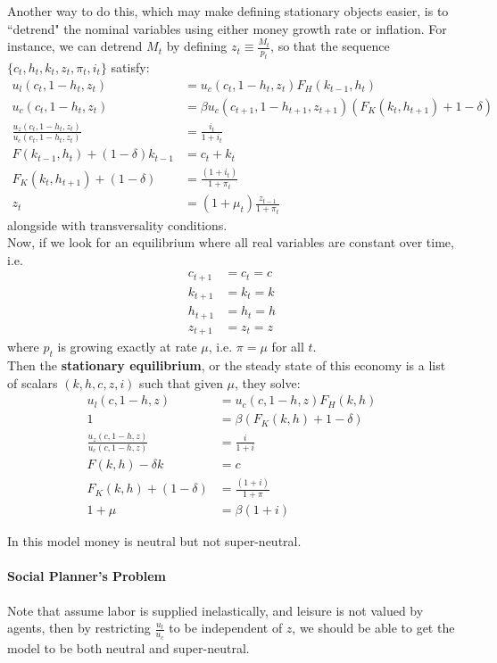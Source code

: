 \documentclass[12pt]{article}
\begin{document}
Another way to do this, which may make defining stationary objects easier, is to ``detrend" the nominal variables using either money growth rate or inflation. For instance, we can detrend $M_t$ by defining $z_t \equiv \frac{M_t}{p_t}$, so that the sequence $\{c_t, h_t, k_t, z_t, \pi_t, i_t\}$ satisfy:
\begin{align}
	u_l(c_t, 1-h_t, z_t) &= u_c(c_t, 1-h_t, z_t)F_H(k_{t-1}, h_t)\\
	u_c(c_t, 1-h_t, z_t) &= \beta u_c(c_{t+1}, 1-h_{t+1}, z_{t+1})(F_K(k_t, h_{t+1}) + 1 - \delta)\\
	\frac{u_z(c_t, 1-h_t, z_t)}{u_c(c_t, 1-h_t, z_t)} &= \frac{i_t}{1+i_t}\\
	F(k_{t-1}, h_t) + (1-\delta)k_{t-1} &= c_t + k_t\\
	F_K(k_t, h_{t+1}) + (1-\delta) &= \frac{(1+i_t)}{1+\pi_t}\\
	z_t &= (1+\mu_t) \frac{z_{t-1}}{1+\pi_t}
\end{align}
alongside with transversality conditions.\\
Now, if we look for an equilibrium where all real variables are constant over time, i.e.
\begin{align*}
	c_{t+1} &= c_t = c\\
	k_{t+1} &= k_t = k\\
	h_{t+1} &= h_t = h\\
	z_{t+1} &= z_t = z
\end{align*}
where $p_t$ is growing exactly at rate $\mu$, i.e. $\pi = \mu$ for all $t$.\\

\noindent
Then the \textbf{stationary equilibrium}, or the steady state of this economy is a list of scalars $(k, h, c, z, i)$ such that given $\mu$, they solve:
\begin{align}
	u_l(c, 1-h, z) &= u_c(c, 1-h, z)F_H(k, h)\\
	1&= \beta (F_K(k, h) + 1 - \delta)\\
	\frac{u_z(c, 1-h, z)}{u_c(c, 1-h, z)} &= \frac{i}{1+i}\\
	F(k, h) -\delta k &= c\\
	F_K(k, h) + (1-\delta) &= \frac{(1+i)}{1+\pi}\\
	1+\mu &= \beta (1+i)
\end{align}
\begin{proposition}
	In this model money is neutral but not super-neutral.
\end{proposition}

\paragraph{Social Planner's Problem \\ [6pt]}
Note that assume labor is supplied inelastically, and leisure is not valued by agents, then by restricting $\frac{u_l}{u_c}$ to be independent of $z$, we should be able to get the model to be both neutral and super-neutral.\\
\end{document}
